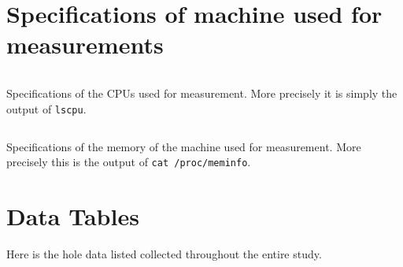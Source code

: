 \section{Specifications of machine used for measurements}
\begin{code}
    \captionsetup{type=table}
    \inputminted{text}{gfx/zeusLscpu.log}
    \caption[Specifications of the CPUs used for measurement]{
        Specifications of the CPUs used for measurement.
        More precisely it is simply the output of \texttt{lscpu}.
    }
    \label{tab:lscpu}
\end{code}
\begin{code}
    \captionsetup{type=table}
    \inputminted{text}{gfx/zeusMeminfo.log}
    \caption[Specifications of the memory of the machine used for measurement]{
        Specifications of the memory of the machine used for measurement.
        More precisely this is the output of \texttt{cat /proc/meminfo}.
    }
    \label{tab:meminfo}
\end{code}

\section{Data Tables}\label{sec:dataTables}
Here is the hole data listed collected throughout the entire study.
\begin{footnotesize}
\end{footnotesize}
